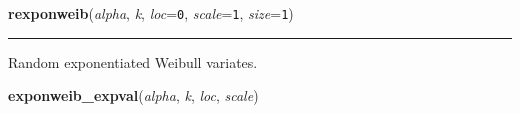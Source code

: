     \begin{boxedminipage}{\textwidth}

    \raggedright \textbf{rexponweib}(\textit{alpha}, \textit{k}, \textit{loc}=\texttt{0}, \textit{scale}=\texttt{1}, \textit{size}=\texttt{1})

    \vspace{-1.5ex}

    \rule{\textwidth}{0.5\fboxrule}

Random exponentiated Weibull variates.
    \vspace{1ex}

    \end{boxedminipage}

    \label{pymc:distributions:exponweib_expval}

    \vspace{0.5ex}

    \begin{boxedminipage}{\textwidth}

    \raggedright \textbf{exponweib\_expval}(\textit{alpha}, \textit{k}, \textit{loc}, \textit{scale})

    \end{boxedminipage}

    \label{pymc:distributions:exponweib_like}

    \vspace{0.5ex}

